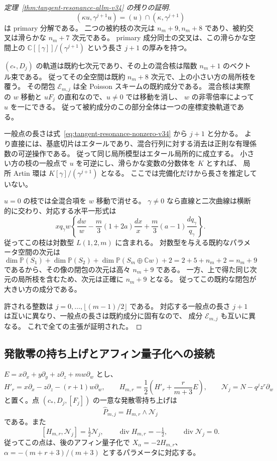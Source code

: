 \begin{proof}[定理~\ref{thm:tangent-resonance-allm-v34} の残りの証明]
\[
 (\kappa u,\gamma^{j+1}u)
 =(u)\cap(\kappa,\gamma^{j+1})
\]
は primary 分解である。
二つの被約枝の次元は $n_m+9,n_m+8$ であり、被約交叉は滑らかな $n_m+7$ 次元である。
primary 成分同士の交叉は、この滑らかな空間上の
$\mathbb C[[\gamma]]/(\gamma^{j+1})$ という長さ $j+1$ の厚みを持つ。

$(c_*,D_j)$ の軌道は既約七次元であり、その上の混合核は階数 $n_m+1$ のベクトル束である。
従ってその全空間は既約 $n_m+8$ 次元で、上の小さい方の局所枝を覆う。
その閉包 $\mathscr E_{m,j}$ は全 Poisson スキームの既約成分である。
混合核は実際の $w$ 移動と $uF_j$ の直和なので、$u\ne0$ では移動を消し、
$w$ の非零倍率によって $u$ を一にできる。
従って被約成分のこの部分全体は一つの座標変換軌道である。

一般点の長さは式~\eqref{eq:tangent-resonance-nonzero-v34} から $j+1$ と分かる。
より直接には、基底切片はエタールであり、混合行列に対する消去は正則な有理係数の可逆操作である。
従って同じ局所模型はエタール局所的に成立する。
小さい方の枝の一般点で $u$ を可逆にし、滑らかな変数の分数体を $K$ とすれば、
局所 Artin 環は $K[\gamma]/(\gamma^{j+1})$ となる。
ここでは完備化だけから長さを推定していない。

$u=0$ の枝では全混合項を $w$ 移動で消せる。
$\gamma\ne0$ なら直線と二次曲線は横断的に交わり、対応する水平一形式は
\[
 xq_\gamma w\left\{\frac{dw}{w}
 -\frac m3(1+2a)\frac{dx}{x}
 +\frac m3(a-1)\frac{dq_\gamma}{q_\gamma}\right\}.
\]
従ってこの枝は対数型 $L(1,2,m)$ に含まれる。
対数型を与える既約なパラメータ空間の次元は
\[
 \dim\mathbb P(S_1)+\dim\mathbb P(S_2)
 +\dim\mathbb P(S_m\oplus\mathbb Cw)+2
 =2+5+n_m+2=n_m+9
\]
であるから、その像の閉包の次元は高々 $n_m+9$ である。
一方、上で得た同じ次元の局所枝を含むため、次元は正確に $n_m+9$ となる。
従ってこの既約な閉包が大きい方の成分である。

許される整数は $j=0,\ldots,\lfloor(m-1)/2\rfloor$ である。
対応する一般点の長さ $j+1$ は互いに異なり、一般点の長さは既約成分に固有なので、
成分 $\mathscr E_{m,j}$ も互いに異なる。
これで全ての主張が証明された。
\end{proof}

\subsection{発散零の持ち上げとアフィン量子化への接続}

\begin{proposition}
\label{prop:resonance-affine-lift-v34}
$E=x\partial_x+y\partial_y+z\partial_z+mw\partial_w$ とし、
\[
 H'_r=x\partial_x-z\partial_z-(r+1)w\partial_w,\qquad
 H_{m,r}=\frac12\left(H'_r+\frac r{m+3}E\right),
 \qquad \mathcal N_j=N-q^jz^r\partial_w
\]
と置く。点 $(c_*,D_j,[F_j])$ の一意な発散零持ち上げは
\[
 \widehat P_{m,j}=H_{m,r}\wedge\mathcal N_j
\]
である。また
\[
 [H_{m,r},\mathcal N_j]=\tfrac12\mathcal N_j,\qquad
 \operatorname{div}H_{m,r}=-\tfrac12,\qquad
 \operatorname{div}\mathcal N_j=0.
\]
従ってこの点は、後のアフィン量子化で
$X_\alpha=-2H_{m,r}$、$\alpha=-(m+r+3)/(m+3)$ とするパラメータに対応する。
\end{proposition}


